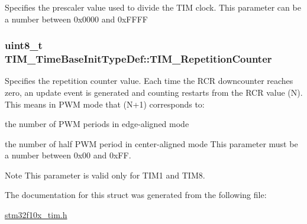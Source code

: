 \label{structTIM__TimeBaseInitTypeDef_a6d3c8632780db819b2eb811e71ce251e}
Specifies the prescaler value used to divide the TIM clock. This parameter can be a number between 0x0000 and 0xFFFF \hypertarget{structTIM__TimeBaseInitTypeDef_a81648259851390e090e1f507dfea7de8}{
\subsubsection[{TIM\_\-RepetitionCounter}]{\setlength{\rightskip}{0pt plus 5cm}uint8\_\-t {\bf TIM\_\-TimeBaseInitTypeDef::TIM\_\-RepetitionCounter}}}
\label{structTIM__TimeBaseInitTypeDef_a81648259851390e090e1f507dfea7de8}
Specifies the repetition counter value. Each time the RCR downcounter reaches zero, an update event is generated and counting restarts from the RCR value (N). This means in PWM mode that (N+1) corresponds to:
\begin{DoxyItemize}
\item the number of PWM periods in edge-\/aligned mode
\item the number of half PWM period in center-\/aligned mode This parameter must be a number between 0x00 and 0xFF. \begin{DoxyNote}{Note}
This parameter is valid only for TIM1 and TIM8. 
\end{DoxyNote}

\end{DoxyItemize}

The documentation for this struct was generated from the following file:\begin{DoxyCompactItemize}
\item 
\hyperlink{stm32f10x__tim_8h}{stm32f10x\_\-tim.h}\end{DoxyCompactItemize}
